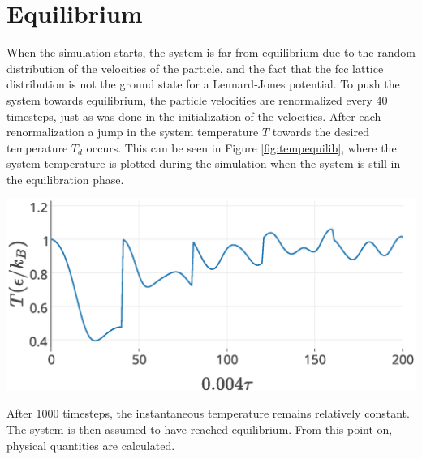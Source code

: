 \section{Equilibrium}
When the simulation starts, the system is far from equilibrium due to the random distribution of the velocities of the particle, and the fact that the fcc lattice distribution is not the ground state for a Lennard-Jones potential\cite{travesset2014phase}\cite{van1991can}. To push the system towards equilibrium, the particle velocities are renormalized every 40 timesteps, just as was done in the initialization of the velocities. After each renormalization a jump in the system temperature $T$ towards the desired temperature $T_d$ occurs. This can be seen in Figure \ref{fig:tempequilib}, where the system temperature is plotted during the simulation when the system is still in the equilibration phase. 
\begin{Figure}
 \centering
 \includegraphics[width=1\linewidth]{equilibration.eps}
 \label{fig:tempequilib}
\end{Figure}

After 1000 timesteps, the instantaneous temperature remains relatively constant. The system is then assumed to have reached equilibrium. From this point on, physical quantities are calculated.
